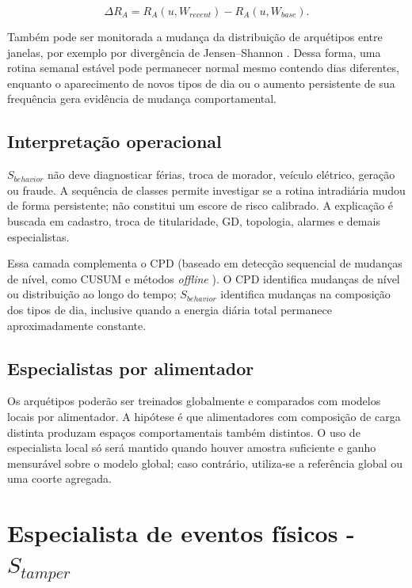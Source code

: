 \[\Delta R_A=R_A(u,W_{recent})-R_A(u,W_{base}).\]

Também pode ser monitorada a mudança da distribuição de arquétipos entre janelas, por exemplo por divergência de Jensen--Shannon \autocite{lin1991}. Dessa forma, uma rotina semanal estável pode permanecer normal mesmo contendo dias diferentes, enquanto o aparecimento de novos tipos de dia ou o aumento persistente de sua frequência gera evidência de mudança comportamental.

\subsection{Interpretação operacional}\label{interpretauxe7uxe3o-operacional}

\(S_{behavior}\) não deve diagnosticar férias, troca de morador, veículo elétrico, geração ou fraude. A sequência de classes permite investigar se a rotina intradiária mudou de forma persistente; não constitui um escore de risco calibrado. A explicação é buscada em cadastro, troca de titularidade, GD, topologia, alarmes e demais especialistas.

Essa camada complementa o CPD (baseado em detecção sequencial de mudanças de nível, como CUSUM \autocite{page1954} e métodos \textit{offline} \autocite{truong2020}). O CPD identifica mudanças de nível ou distribuição ao longo do tempo; \(S_{behavior}\) identifica mudanças na composição dos tipos de dia, inclusive quando a energia diária total permanece aproximadamente constante.

\subsection{Especialistas por alimentador}\label{especialistas-por-alimentador}

Os arquétipos poderão ser treinados globalmente e comparados com modelos locais por alimentador. A hipótese é que alimentadores com composição de carga distinta produzam espaços comportamentais também distintos. O uso de especialista local só será mantido quando houver amostra suficiente e ganho mensurável sobre o modelo global; caso contrário, utiliza-se a referência global ou uma coorte agregada.

\section{\texorpdfstring{Especialista de eventos físicos - \(S_{tamper}\)}{Especialista de eventos físicos - S\_\{tamper\}}}\label{especialista-de-eventos-fuxedsicos---s_tamper}

